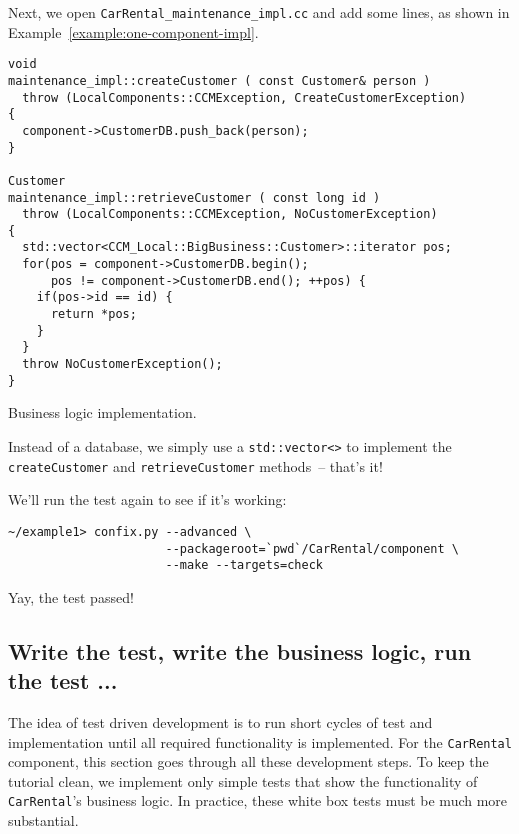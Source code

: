 Next, we open {\tt CarRental\_maintenance\_impl.cc} and add some lines, as 
shown in Example~\ref{example:one-component-impl}.
\begin{Example}
\begin{minifbox}
\begin{small}
\begin{verbatim}
void
maintenance_impl::createCustomer ( const Customer& person )
  throw (LocalComponents::CCMException, CreateCustomerException)
{
  component->CustomerDB.push_back(person);
}

Customer
maintenance_impl::retrieveCustomer ( const long id )
  throw (LocalComponents::CCMException, NoCustomerException)
{
  std::vector<CCM_Local::BigBusiness::Customer>::iterator pos;
  for(pos = component->CustomerDB.begin(); 
      pos != component->CustomerDB.end(); ++pos) {
    if(pos->id == id) {
      return *pos;
    }
  }
  throw NoCustomerException();
}
\end{verbatim}
\end{small}
\end{minifbox}
\caption{Business logic implementation.}
\label{example:one-component-impl}
\end{Example}

Instead of a database, we simply use a {\tt std::vector<>} to implement
the {\tt createCustomer} and {\tt retrieveCustomer} methods~-- that's it! 

We'll run the test again to see if it's working:
\begin{small}
\begin{verbatim}
~/example1> confix.py --advanced \
                      --packageroot=`pwd`/CarRental/component \
                      --make --targets=check
\end{verbatim}
\end{small}

Yay, the test passed!



\subsection{Write the test, write the business logic, run the test ...}
The idea of test driven development is to run short cycles of test and
implementation until all required functionality is implemented.
For the {\tt CarRental} component, this section goes through all these 
development steps. 
To keep the tutorial clean, we implement only simple tests that show the
functionality of {\tt CarRental}'s business logic.
In practice, these white box tests must be much more substantial.

